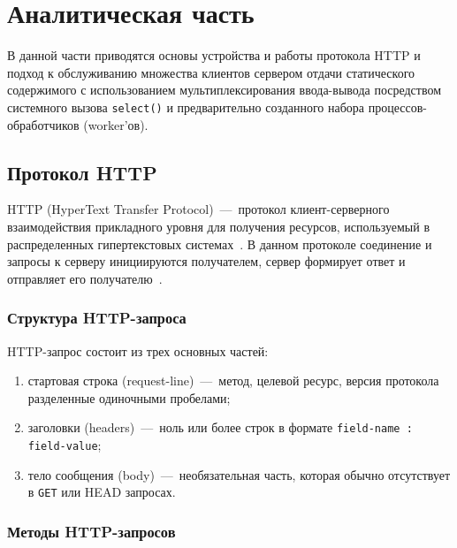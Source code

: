 \chapter{Аналитическая часть}

В данной части приводятся основы устройства и работы протокола HTTP и подход к обслуживанию множества клиентов сервером отдачи статического содержимого с использованием мультиплексирования ввода-вывода посредством системного вызова \texttt{select()} и предварительно созданного набора процессов-обработчиков (worker'ов).

\section{Протокол HTTP}

HTTP (HyperText Transfer Protocol)~---~протокол клиент-серверного взаимодействия прикладного уровня для получения ресурсов, используемый в распределенных гипертекстовых системах~\cite{rfc9112}. В данном протоколе соединение и запросы к серверу инициируются получателем, сервер формирует ответ и отправляет его получателю~\cite{mdn_http_overview}.

\subsection{Структура HTTP-запроса}

HTTP-запрос состоит из трех основных частей:
\begin{enumerate}
\item стартовая строка (request-line)~---~метод, целевой ресурс, версия протокола разделенные одиночными пробелами;
\item заголовки (headers)~---~ноль или более строк в формате \texttt{field-name : field-value};
\item тело сообщения (body)~---~необязательная часть, которая обычно отсутствует в \texttt{GET} или {HEAD} запросах.
\end{enumerate}


\subsection{Методы HTTP-запросов}

